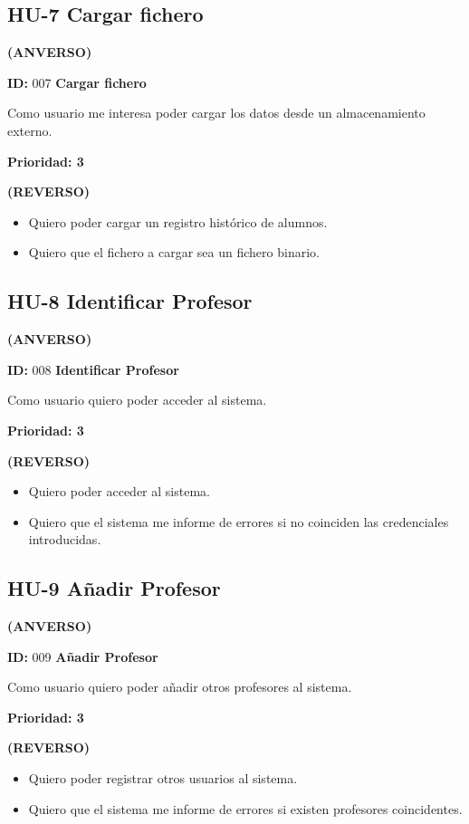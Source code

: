 \subsection{HU-7 Cargar fichero}
\textbf{(ANVERSO)}

\textbf{ID:} 007 \textbf{Cargar fichero}

Como usuario me interesa poder cargar los datos desde un almacenamiento externo.

\textbf{Prioridad: 3}

\textbf{(REVERSO)}
\begin{itemize}
	\item Quiero poder cargar un registro histórico de alumnos.
	\item Quiero que el fichero a cargar sea un fichero binario.
\end{itemize}

\subsection{HU-8 Identificar Profesor}
\textbf{(ANVERSO)}

\textbf{ID:} 008 \textbf{Identificar Profesor}

Como usuario quiero poder acceder al sistema.

\textbf{Prioridad: 3}

\textbf{(REVERSO)}
\begin{itemize}
	\item Quiero poder acceder al sistema.
	\item Quiero que el sistema me informe de errores si no coinciden las credenciales introducidas.
\end{itemize}

\subsection{HU-9 Añadir Profesor}
\textbf{(ANVERSO)}

\textbf{ID:} 009 \textbf{Añadir Profesor}

Como usuario quiero poder añadir otros profesores al sistema.

\textbf{Prioridad: 3}

\textbf{(REVERSO)}
\begin{itemize}
	\item Quiero poder registrar otros usuarios al sistema.
	\item Quiero que el sistema me informe de errores si existen profesores coincidentes.
\end{itemize}

